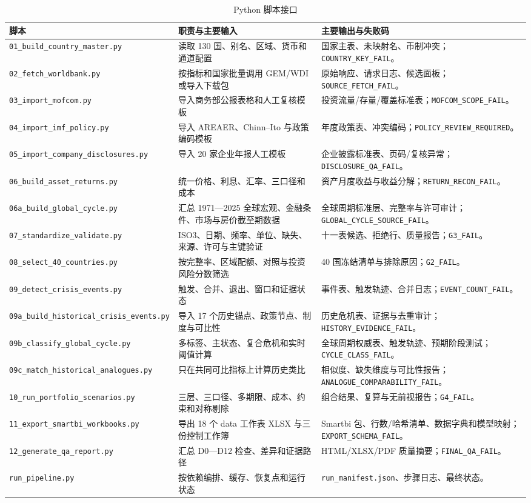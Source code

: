 \documentclass[UTF8,fontset=windows,12pt,openany]{ctexbook}
\newcommand{\Field}[1]{{\small\nolinkurl{#1}}}
\newcommand{\File}[1]{{\small\begingroup\urlstyle{same}\nolinkurl{#1}\endgroup}}
\begin{document}
\begin{longtable}{p{4.3cm}p{4.5cm}p{4.6cm}}
\caption{Python 脚本接口}\label{tab:scripts}\\
\toprule
\textbf{脚本} & \textbf{职责与主要输入} & \textbf{主要输出与失败码}\\
\midrule
\File{01_build_country_master.py} & 读取 130 国、别名、区域、货币和通道配置 & 国家主表、未映射名、币制冲突；\Field{COUNTRY_KEY_FAIL}。\\
\File{02_fetch_worldbank.py} & 按指标和国家批量调用 GEM/WDI 或导入下载包 & 原始响应、请求日志、候选面板；\Field{SOURCE_FETCH_FAIL}。\\
\File{03_import_mofcom.py} & 导入商务部公报表格和人工复核模板 & 投资流量/存量/覆盖标准表；\Field{MOFCOM_SCOPE_FAIL}。\\
\File{04_import_imf_policy.py} & 导入 AREAER、Chinn--Ito 与政策编码模板 & 年度政策表、冲突编码；\Field{POLICY_REVIEW_REQUIRED}。\\
\File{05_import_company_disclosures.py} & 导入 20 家企业年报人工模板 & 企业披露标准表、页码/复核异常；\Field{DISCLOSURE_QA_FAIL}。\\
\File{06_build_asset_returns.py} & 统一价格、利息、汇率、三口径和成本 & 资产月度收益与收益分解；\Field{RETURN_RECON_FAIL}。\\
\File{06a_build_global_cycle.py} & 汇总 1971—2025 全球宏观、金融条件、市场与房价截至期数据 & 全球周期标准层、完整率与许可审计；\Field{GLOBAL_CYCLE_SOURCE_FAIL}。\\
\File{07_standardize_validate.py} & ISO3、日期、频率、单位、缺失、来源、许可与主键验证 & 十一表候选、拒绝行、质量报告；\Field{G3_FAIL}。\\
\File{08_select_40_countries.py} & 按完整率、区域配额、对照与投资风险分数筛选 & 40 国冻结清单与排除原因；\Field{G2_FAIL}。\\
\File{09_detect_crisis_events.py} & 触发、合并、退出、窗口和证据状态 & 事件表、触发轨迹、合并日志；\Field{EVENT_COUNT_FAIL}。\\
\File{09a_build_historical_crisis_events.py} & 导入 17 个历史锚点、政策节点、制度与可比性 & 历史危机表、证据与去重审计；\Field{HISTORY_EVIDENCE_FAIL}。\\
\File{09b_classify_global_cycle.py} & 多标签、主状态、复合危机和实时阈值计算 & 全球周期权威表、触发轨迹、预期阶段测试；\Field{CYCLE_CLASS_FAIL}。\\
\File{09c_match_historical_analogues.py} & 只在共同可比指标上计算历史类比 & 相似度、缺失维度与可比性报告；\Field{ANALOGUE_COMPARABILITY_FAIL}。\\
\File{10_run_portfolio_scenarios.py} & 三层、三口径、多期限、成本、约束和对称剔除 & 组合结果、复算与无前视报告；\Field{G4_FAIL}。\\
\File{11_export_smartbi_workbooks.py} & 导出 18 个 data 工作表 XLSX 与三份控制工作簿 & Smartbi 包、行数/哈希清单、数据字典和模型映射；\Field{EXPORT_SCHEMA_FAIL}。\\
\File{12_generate_qa_report.py} & 汇总 D0—D12 检查、差异和证据路径 & HTML/XLSX/PDF 质量摘要；\Field{FINAL_QA_FAIL}。\\
\File{run_pipeline.py} & 按依赖编排、缓存、恢复点和运行状态 & \File{run_manifest.json}、步骤日志、最终状态。\\
\bottomrule
\end{longtable}
\end{document}
